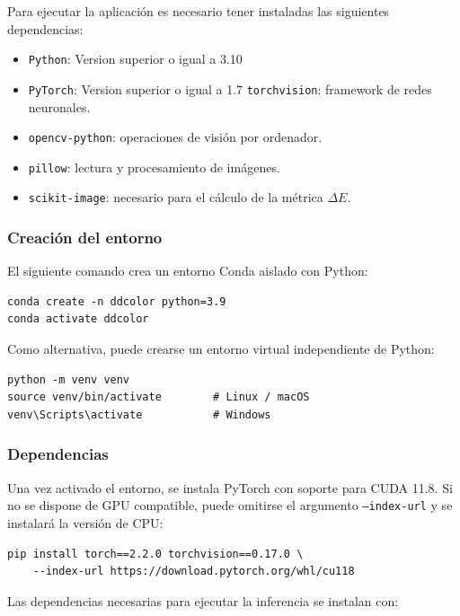 \documentclass[a4paper]{article}
\begin{document}
Para ejecutar la aplicación es necesario tener instaladas las siguientes dependencias:

\begin{itemize}
	\item \texttt{Python}: Version superior o igual a 3.10
	\item \texttt{PyTorch}: Version superior o igual a 1.7
	\texttt{torchvision}: framework de redes neuronales.
	\item \texttt{opencv-python}: operaciones de visión por ordenador.
	\item \texttt{pillow}: lectura y procesamiento de imágenes.
	\item \texttt{scikit-image}: necesario para el cálculo de la métrica $\Delta E$.
	
\end{itemize}

\subsubsection{Creación del entorno}

El siguiente comando crea un entorno Conda aislado con Python:

\begin{verbatim}
conda create -n ddcolor python=3.9
conda activate ddcolor
\end{verbatim}

Como alternativa, puede crearse un entorno virtual independiente de Python:

\begin{verbatim}
python -m venv venv
source venv/bin/activate        # Linux / macOS
venv\Scripts\activate           # Windows
\end{verbatim}

\subsubsection{Dependencias}

Una vez activado el entorno, se instala PyTorch con soporte para CUDA 11.8. Si no se dispone de GPU compatible, puede omitirse el argumento \texttt{--index-url} y se instalará la versión de CPU:

\begin{verbatim}
pip install torch==2.2.0 torchvision==0.17.0 \
    --index-url https://download.pytorch.org/whl/cu118
\end{verbatim}

Las dependencias necesarias para ejecutar la inferencia se instalan con:
\end{document}
